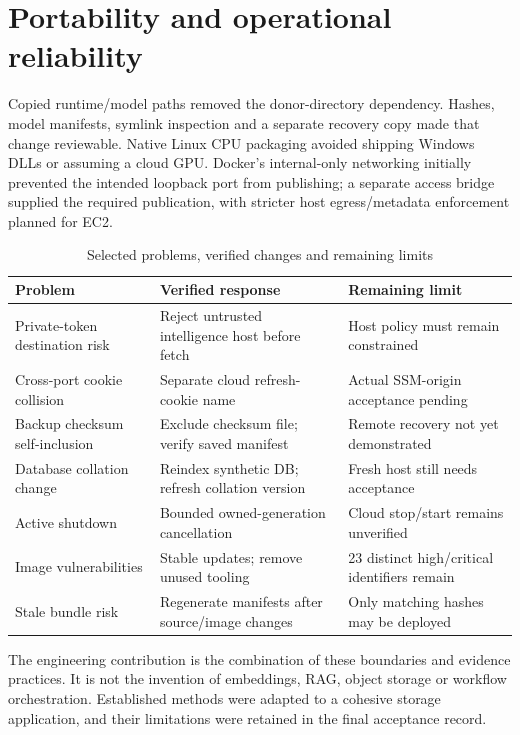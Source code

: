 \section{Portability and operational reliability}
Copied runtime/model paths removed the donor-directory dependency. Hashes, model manifests, symlink inspection and a separate recovery copy made that change reviewable. Native Linux CPU packaging avoided shipping Windows DLLs or assuming a cloud GPU. Docker's internal-only networking initially prevented the intended loopback port from publishing; a separate access bridge supplied the required publication, with stricter host egress/metadata enforcement planned for EC2.
\par\begin{table}[htbp]\caption{Selected problems, verified changes and remaining limits}\small\begin{tabularx}{\linewidth}{p{.25\linewidth}YY}\toprule Problem&Verified response&Remaining limit\\\midrule
Private-token destination risk&Reject untrusted intelligence host before fetch&Host policy must remain constrained\\
Cross-port cookie collision&Separate cloud refresh-cookie name&Actual SSM-origin acceptance pending\\
Backup checksum self-inclusion&Exclude checksum file; verify saved manifest&Remote recovery not yet demonstrated\\
Database collation change&Reindex synthetic DB; refresh collation version&Fresh host still needs acceptance\\
Active shutdown&Bounded owned-generation cancellation&Cloud stop/start remains unverified\\
Image vulnerabilities&Stable updates; remove unused tooling&23 distinct high/critical identifiers remain\\
Stale bundle risk&Regenerate manifests after source/image changes&Only matching hashes may be deployed\\\bottomrule\end{tabularx}\end{table}\par
The engineering contribution is the combination of these boundaries and evidence practices. It is not the invention of embeddings, RAG, object storage or workflow orchestration. Established methods were adapted to a cohesive storage application, and their limitations were retained in the final acceptance record.
\FloatBarrier
